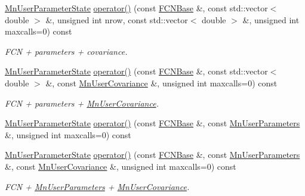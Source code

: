 \begin{DoxyCompactItemize}
\mbox{\hyperlink{classROOT_1_1Minuit2_1_1MnUserParameterState}{Mn\+User\+Parameter\+State}} \mbox{\hyperlink{classROOT_1_1Minuit2_1_1MnHesse_aa02f8d7bd10ea245658c9c1b3e296a45}{operator()}} (const \mbox{\hyperlink{classROOT_1_1Minuit2_1_1FCNBase}{F\+C\+N\+Base}} \&, const std\+::vector$<$ double $>$ \&, unsigned int nrow, const std\+::vector$<$ double $>$ \&, unsigned int maxcalls=0) const
\begin{DoxyCompactList}\small\item\em F\+CN + parameters + covariance. \end{DoxyCompactList}\item 
\mbox{\hyperlink{classROOT_1_1Minuit2_1_1MnUserParameterState}{Mn\+User\+Parameter\+State}} \mbox{\hyperlink{classROOT_1_1Minuit2_1_1MnHesse_a5d575c4f72e0024578b07579a7e3a4a3}{operator()}} (const \mbox{\hyperlink{classROOT_1_1Minuit2_1_1FCNBase}{F\+C\+N\+Base}} \&, const std\+::vector$<$ double $>$ \&, const \mbox{\hyperlink{classROOT_1_1Minuit2_1_1MnUserCovariance}{Mn\+User\+Covariance}} \&, unsigned int maxcalls=0) const
\begin{DoxyCompactList}\small\item\em F\+CN + parameters + \mbox{\hyperlink{classROOT_1_1Minuit2_1_1MnUserCovariance}{Mn\+User\+Covariance}}. \end{DoxyCompactList}\item 
\mbox{\hyperlink{classROOT_1_1Minuit2_1_1MnUserParameterState}{Mn\+User\+Parameter\+State}} \mbox{\hyperlink{classROOT_1_1Minuit2_1_1MnHesse_ab7a2674f254e7f6056885d7d792ea671}{operator()}} (const \mbox{\hyperlink{classROOT_1_1Minuit2_1_1FCNBase}{F\+C\+N\+Base}} \&, const \mbox{\hyperlink{classROOT_1_1Minuit2_1_1MnUserParameters}{Mn\+User\+Parameters}} \&, unsigned int maxcalls=0) const
\item 
\mbox{\hyperlink{classROOT_1_1Minuit2_1_1MnUserParameterState}{Mn\+User\+Parameter\+State}} \mbox{\hyperlink{classROOT_1_1Minuit2_1_1MnHesse_aeba6a2c85b9bda7785d418a6e2605722}{operator()}} (const \mbox{\hyperlink{classROOT_1_1Minuit2_1_1FCNBase}{F\+C\+N\+Base}} \&, const \mbox{\hyperlink{classROOT_1_1Minuit2_1_1MnUserParameters}{Mn\+User\+Parameters}} \&, const \mbox{\hyperlink{classROOT_1_1Minuit2_1_1MnUserCovariance}{Mn\+User\+Covariance}} \&, unsigned int maxcalls=0) const
\begin{DoxyCompactList}\small\item\em F\+CN + \mbox{\hyperlink{classROOT_1_1Minuit2_1_1MnUserParameters}{Mn\+User\+Parameters}} + \mbox{\hyperlink{classROOT_1_1Minuit2_1_1MnUserCovariance}{Mn\+User\+Covariance}}. \end{DoxyCompactList}\item 

\end{DoxyCompactItemize}
